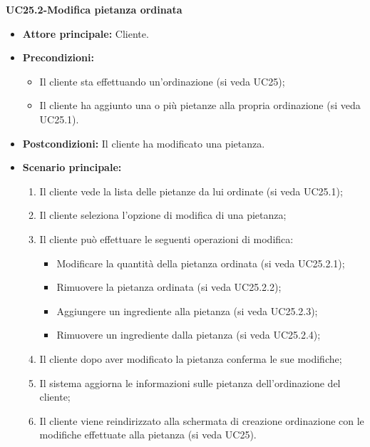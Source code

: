 \textbf{UC25.2-Modifica pietanza ordinata}
\begin{itemize}
\item \textbf{Attore principale:} Cliente.
\item \textbf{Precondizioni:}
\begin{itemize}
    \item Il cliente sta effettuando un'ordinazione (si veda UC25);
    \item Il cliente ha aggiunto una o più pietanze alla propria ordinazione (si veda UC25.1).
\end{itemize}
\item \textbf{Postcondizioni:} Il cliente ha modificato una pietanza.
\item \textbf{Scenario principale:}
\begin{enumerate}
    \item Il cliente vede la lista delle pietanze da lui ordinate (si veda UC25.1);
    \item Il cliente seleziona l'opzione di modifica di una pietanza;
    \item Il cliente può effettuare le seguenti operazioni di modifica:
    \begin{itemize}
        \item Modificare la quantità della pietanza ordinata (si veda UC25.2.1);
        \item Rimuovere la pietanza ordinata (si veda UC25.2.2);
        \item Aggiungere un ingrediente alla pietanza (si veda UC25.2.3);
        \item Rimuovere un ingrediente dalla pietanza (si veda UC25.2.4);
    \end{itemize}
    \item Il cliente dopo aver modificato la pietanza conferma le sue modifiche;
    \item Il sistema aggiorna le informazioni sulle pietanza dell'ordinazione del cliente;
    \item Il cliente viene reindirizzato alla schermata di creazione ordinazione con le modifiche effettuate alla pietanza (si veda UC25).
\end{enumerate}
\end{itemize}

